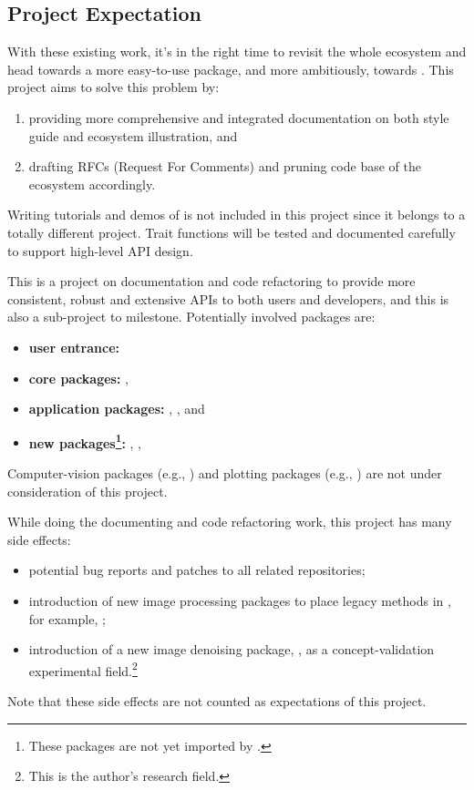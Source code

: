 \newpage
\subsection*{Project Expectation}
With these existing work, it's in the right time to revisit the whole \images{} ecosystem and head towards a more easy-to-use \images{} package, and more ambitiously, towards \images{} . This project aims to solve this problem by:
{\normalsize
\begin{enumerate}
    \item providing more comprehensive and integrated documentation on both style guide and ecosystem illustration, and
    \item drafting RFCs (Request For Comments) and pruning code base of the ecosystem accordingly.
\end{enumerate}
}
Writing tutorials and demos of \images{} is not included in this project since it belongs to a totally different project. Trait functions will be tested and documented carefully to support high-level API design.

This is a project on documentation and code refactoring to provide more consistent, robust and extensive APIs to both users and developers, and this is also a sub-project to \images{}  milestone. Potentially involved packages are:
{\small
\begin{itemize}
    \item \textbf{user entrance:} \repoimages
    \item \textbf{core packages:} \repoimagecore, \repoimageaxes
    \item \textbf{application packages:} \repoimagemorphology, \repoimagetransformations, \repoimagedistance \repoimagemetadata and \repoimagefiltering
    \item \textbf{new packages\footnote{These packages are not yet imported by \images.}:} \repoimagebinarization, \repohistogramthresholding, \repoimageinpainting
\end{itemize}
}
Computer-vision packages (e.g., \repoimagetracking) and plotting packages (e.g., \repoimageview) are not under consideration of this project.\par

While doing the documenting and code refactoring work, this project has many side effects:
{\normalsize
\begin{itemize}
    \item potential bug reports and patches to all related \langjulia repositories;
    \item introduction of new image processing packages to place legacy methods in \images, for example, ;
    \item introduction of a new image denoising package, \repoimagenoise, as a concept-validation experimental field.\footnote{This is the author's research field.}
\end{itemize}
}
Note that these side effects are not counted as expectations of this project.\par

